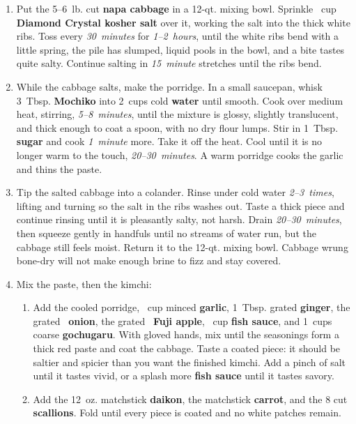 \documentclass[11pt,letterpaper]{article}
\begin{document}
\begin{enumerate}
    \item Put the 5--6~lb. cut \textbf{napa cabbage} in a 12-qt. mixing bowl. Sprinkle ~cup \textbf{Diamond Crystal kosher salt} over it, working the salt into the thick white ribs. Toss every \textit{30~minutes} for \textit{1--2~hours}, until the white ribs bend with a little spring, the pile has slumped, liquid pools in the bowl, and a bite tastes quite salty. Continue salting in \textit{15~minute} stretches until the ribs bend.

    \item While the cabbage salts, make the porridge. In a small saucepan, whisk 3~Tbsp. \textbf{Mochiko} into 2~cups cold \textbf{water} until smooth. Cook over medium heat, stirring, \textit{5--8~minutes}, until the mixture is glossy, slightly translucent, and thick enough to coat a spoon, with no dry flour lumps. Stir in 1~Tbsp. \textbf{sugar} and cook \textit{1~minute} more. Take it off the heat. Cool until it is no longer warm to the touch, \textit{20--30~minutes}. A warm porridge cooks the garlic and thins the paste.

    \item Tip the salted cabbage into a colander. Rinse under cold water \textit{2--3~times}, lifting and turning so the salt in the ribs washes out. Taste a thick piece and continue rinsing until it is pleasantly salty, not harsh. Drain \textit{20--30~minutes}, then squeeze gently in handfuls until no streams of water run, but the cabbage still feels moist. Return it to the 12-qt. mixing bowl. Cabbage wrung bone-dry will not make enough brine to fizz and stay covered.

    \item Mix the paste, then the kimchi:
    \begin{enumerate}
        \item Add the cooled porridge, ~cup minced \textbf{garlic}, 1~Tbsp. grated \textbf{ginger}, the grated ~\textbf{onion}, the grated ~\textbf{Fuji apple}, ~cup \textbf{fish sauce}, and 1~cups coarse \textbf{gochugaru}. With gloved hands, mix until the seasonings form a thick red paste and coat the cabbage. Taste a coated piece: it should be saltier and spicier than you want the finished kimchi. Add a pinch of salt until it tastes vivid, or a splash more \textbf{fish sauce} until it tastes savory.
        \item Add the 12~oz. matchstick \textbf{daikon}, the matchstick \textbf{carrot}, and the 8 cut \textbf{scallions}. Fold until every piece is coated and no white patches remain.
    \end{enumerate}


\end{enumerate}
\end{document}
